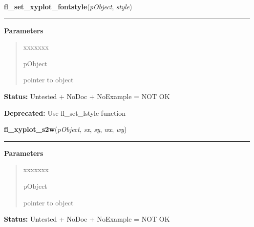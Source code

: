 \hspace{.8\funcindent}\begin{boxedminipage}{\funcwidth}

    \raggedright \textbf{fl\_set\_xyplot\_fontstyle}(\textit{pObject}, \textit{style})

    \vspace{-1.5ex}

    \rule{\textwidth}{0.5\fboxrule}
\setlength{\parskip}{2ex}
\setlength{\parskip}{1ex}
      \textbf{Parameters}
      \vspace{-1ex}

      \begin{quote}
        \begin{Ventry}{xxxxxxx}

          \item[pObject]

          pointer to object

        \end{Ventry}

      \end{quote}

\textbf{Status:} Untested + NoDoc + NoExample = NOT OK



\textbf{Deprecated:} Use fl\_set\_lstyle function



    \end{boxedminipage}

    \label{xformslib:library:fl_xyplot_s2w}

    \vspace{0.5ex}

\hspace{.8\funcindent}\begin{boxedminipage}{\funcwidth}

    \raggedright \textbf{fl\_xyplot\_s2w}(\textit{pObject}, \textit{sx}, \textit{sy}, \textit{wx}, \textit{wy})

    \vspace{-1.5ex}

    \rule{\textwidth}{0.5\fboxrule}
\setlength{\parskip}{2ex}
\setlength{\parskip}{1ex}
      \textbf{Parameters}
      \vspace{-1ex}

      \begin{quote}
        \begin{Ventry}{xxxxxxx}

          \item[pObject]

          pointer to object

        \end{Ventry}

      \end{quote}

\textbf{Status:} Untested + NoDoc + NoExample = NOT OK



    \end{boxedminipage}

